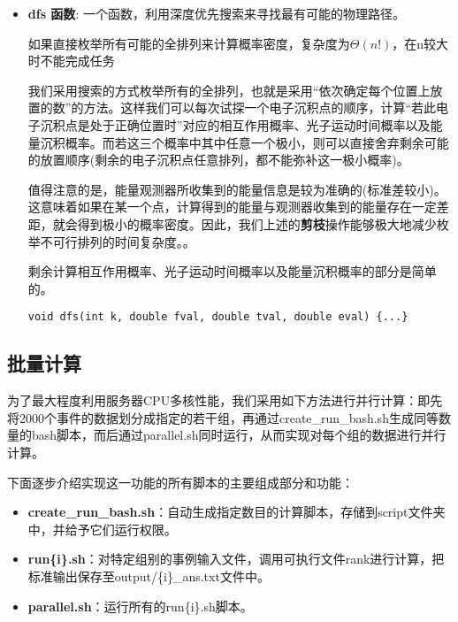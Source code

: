 \documentclass[12pt,a4paper]{article}%
\begin{document}
\begin{tcolorbox}[width=16cm]
    \begin{itemize}    
    \item \textbf{dfs 函数}: 一个函数，利用深度优先搜索来寻找最有可能的物理路径。

    如果直接枚举所有可能的全排列来计算概率密度，复杂度为$\Theta(n!)$，在n较大时不能完成任务

    我们采用搜索的方式枚举所有的全排列，也就是采用“依次确定每个位置上放置的数”的方法。这样我们可以每次试探一个电子沉积点的顺序，计算“若此电子沉积点是处于正确位置时”对应的相互作用概率、光子运动时间概率以及能量沉积概率。而若这三个概率中其中任意一个极小，则可以直接舍弃剩余可能的放置顺序(剩余的电子沉积点任意排列，都不能弥补这一极小概率)。

    值得注意的是，能量观测器所收集到的能量信息是较为准确的(标准差较小)。这意味着如果在某一个点，计算得到的能量与观测器收集到的能量存在一定差距，就会得到极小的概率密度。因此，我们上述的\textbf{剪枝}操作能够极大地减少枚举不可行排列的时间复杂度。。

    剩余计算相互作用概率、光子运动时间概率以及能量沉积概率的部分是简单的。

    \begin{lstlisting}[style=mystyle]
    void dfs(int k, double fval, double tval, double eval) {...}
    \end{lstlisting}
    \end{itemize}
\end{tcolorbox}
 
    
    
    \subsection{批量计算}
    为了最大程度利用服务器CPU多核性能，我们采用如下方法进行并行计算：即先将2000个事件的数据划分成指定的若干组，再通过create\_run\_bash.sh生成同等数量的bash脚本，而后通过parallel.sh同时运行，从而实现对每个组的数据进行并行计算。
    
    下面逐步介绍实现这一功能的所有脚本的主要组成部分和功能：
    
    \begin{tcolorbox}[width=16cm]
 
        \begin{itemize}
            \item \textbf{create\_run\_bash.sh}：自动生成指定数目的计算脚本，存储到script\/文件夹中，并给予它们运行权限。
    
            \item \textbf{run\{i\}.sh}：对特定组别的事例输入文件，调用可执行文件rank进行计算，把标准输出保存至output/\{i\}\_ans.txt文件中。
            
            \item \textbf{parallel.sh}：运行所有的run\{i\}.sh脚本。
            
            \end{itemize}
    \end{tcolorbox}  
    
\end{document}
